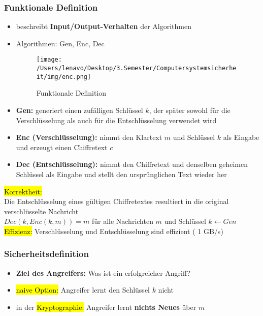 \documentclass[a4paper, 10pt]{article}
\begin{document}
\subsubsection{Funktionale Definition}
\begin{itemize}
    \item beschreibt \textbf{Input/Output-Verhalten} der Algorithmen
    \item Algorithmen: Gen, Enc, Dec
    \begin{figure}[h]
        \centering
        \texttt{[image: /Users/lenavo/Desktop/3.Semester/Computersystemsicherheit/img/enc.png]}
        \caption{Funktionale Definition}
        \label{fig:enter-label}
    \end{figure}

    \item \textbf{Gen:} generiert einen zufälligen Schlüssel $k$, der später sowohl für die Verschlüsselung als auch für die Entschlüsselung verwendet wird
    \item \textbf{Enc (Verschlüsselung):} nimmt den Klartext $m$ und Schlüssel $k$ als Eingabe und erzeugt einen Chiffretext $c$
    \item \textbf{Dec (Entschlüsselung):} nimmt den Chiffretext und denselben geheimen Schlüssel als Eingabe und stellt den ursprünglichen Text wieder her
\end{itemize}
\hl{Korrektheit:}\\
Die Entschlüsselung eines gültigen Chiffretextes resultiert in die original verschlüsselte Nachricht\\[3mm]
$Dec (k,Enc(k,m)) = m$ für alle Nachrichten $m$ und Schlüssel $k \longleftarrow Gen$\\[3mm]
\hl{Effizienz:} Verschlüsselung und Entschlüsselung sind effizient ( 1 GB/s)

\subsubsection{Sicherheitsdefinition}
\begin{itemize}
    \item \textbf{Ziel des Angreifers:} Was ist ein erfolgreicher Angriff?
    \item \hl{naive Option:} Angreifer lernt den Schlüssel $k$ nicht
    \item in der \hl{Kryptographie:} Angreifer lernt \textbf{nichts Neues} über $m$
\end{itemize}
\end{document}
